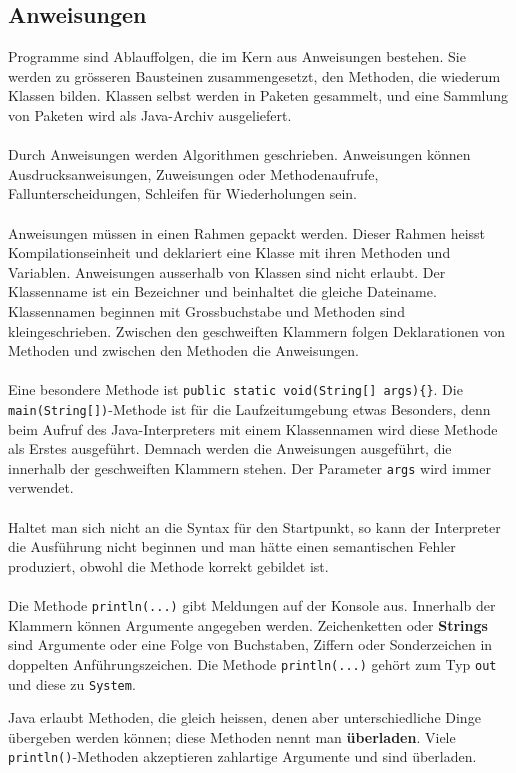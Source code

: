 \subsection{Anweisungen}
Programme sind Ablauffolgen, die im Kern aus Anweisungen bestehen. Sie werden zu grösseren Bausteinen zusammengesetzt, den Methoden, die wiederum Klassen bilden. Klassen selbst werden in Paketen gesammelt, und eine Sammlung von Paketen wird als Java-Archiv ausgeliefert.
\\\\
Durch Anweisungen werden Algorithmen geschrieben. Anweisungen können Ausdrucksanweisungen, Zuweisungen oder Methodenaufrufe, Fallunterscheidungen, Schleifen für Wiederholungen sein.
\\\\
Anweisungen müssen in einen Rahmen gepackt werden. Dieser Rahmen heisst Kompilationseinheit und deklariert eine Klasse mit ihren Methoden und Variablen. Anweisungen ausserhalb von Klassen sind nicht erlaubt. Der Klassenname ist ein Bezeichner und beinhaltet die gleiche Dateiname. Klassennamen beginnen mit Grossbuchstabe und Methoden sind kleingeschrieben. Zwischen den geschweiften Klammern folgen Deklarationen von Methoden und zwischen den Methoden die Anweisungen.
\\\\
Eine besondere Methode ist \texttt{public static void(String[] args)\{\}}. Die \texttt{main(String[])}-Methode ist für die Laufzeitumgebung etwas Besonders, denn beim Aufruf des Java-Interpreters mit einem Klassennamen wird diese Methode als Erstes ausgeführt. Demnach werden die Anweisungen ausgeführt, die innerhalb der geschweiften Klammern stehen. Der Parameter \texttt{args} wird immer verwendet.
\\\\
Haltet man sich nicht an die Syntax für den Startpunkt, so kann der Interpreter die Ausführung nicht beginnen und man hätte einen semantischen Fehler produziert, obwohl die Methode korrekt gebildet ist.
\\\\
Die Methode \texttt{println(...)} gibt Meldungen auf der Konsole aus. Innerhalb der Klammern können Argumente angegeben werden. Zeichenketten oder \textbf{Strings} sind Argumente oder eine Folge von Buchstaben, Ziffern oder Sonderzeichen in doppelten Anführungszeichen. Die Methode \texttt{println(...)} gehört zum Typ \texttt{out} und diese zu \texttt{System}.

Java erlaubt Methoden, die gleich heissen, denen aber unterschiedliche Dinge übergeben werden können; diese Methoden nennt man \textbf{überladen}. Viele \texttt{println()}-Methoden akzeptieren zahlartige Argumente und sind überladen.
